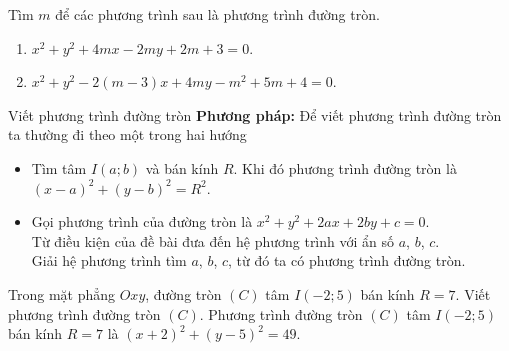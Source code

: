 \begin{bt}%
	Tìm $m$ để các phương trình sau là phương trình đường tròn.
	\begin{enumerate}
		\item $x^2+y^2+4mx-2my+2m+3=0$.
		\item $x^2+y^2-2\left(m-3\right)x+4my-m^2+5m+4=0$.
	\end{enumerate}
\end{bt}


\begin{dang}{Viết phương trình đường tròn}
	\textbf{Phương pháp:} Để viết phương trình đường tròn ta thường đi theo một trong hai hướng
	\begin{itemize}
		\item Tìm tâm $I(a;b)$ và bán kính $R$. Khi đó phương trình đường tròn là $(x-a)^2+(y-b)^2=R^2$.
		\item Gọi phương trình của đường tròn là $x^2+y^2+2ax+2by+c=0$.\\
		Từ điều kiện của đề bài đưa đến hệ phương trình với ẩn số $a$, $b$, $c$.\\
		Giải hệ phương trình tìm $a$, $b$, $c$, từ đó ta có phương trình đường tròn.
	\end{itemize} 
\end{dang}

\begin{vd}%
	Trong mặt phẳng $Oxy$, đường tròn $(C)$ tâm $I(-2;5)$ bán kính $R = 7$. Viết phương trình đường tròn $(C)$.
	\loigiai
	{
		Phương trình đường tròn $(C)$ tâm $I(-2;5)$ bán kính $R = 7$ là $(x + 2)^2 + (y - 5)^2 = 49$.
	}
\end{vd}

